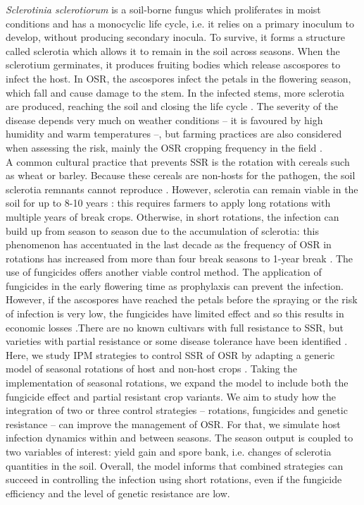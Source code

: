 \documentclass{article}
\begin{document}
\textit{Sclerotinia sclerotiorum} is a soil-borne fungus which proliferates in moist conditions and has a monocyclic life cycle, i.e. it relies on a primary inoculum to develop, without producing secondary inocula. To survive, it forms a structure called sclerotia which allows it to remain in the soil across seasons. When the sclerotium germinates, it produces fruiting bodies which release ascospores to infect the host. In OSR, the ascospores infect the petals in the flowering season, which fall and cause damage to the stem. In the infected stems, more sclerotia are produced, reaching the soil and closing the life cycle \cite{derbyshire:PP:2016, heffer:TPHI:2007}. The severity of the disease depends very much on weather conditions -- it is favoured by high humidity and warm temperatures --, but farming practices are also considered when assessing the risk, mainly the OSR cropping frequency in the field \cite{koch:PhytoP:2007}. 
\\

A common cultural practice that prevents SSR is the rotation with cereals such as wheat or barley. Because these cereals are non-hosts for the pathogen, the soil sclerotia remnants cannot reproduce \cite{}. However, sclerotia can remain viable in the soil for up to 8-10 years \cite{adams:PhytoP:1979}: this requires farmers to apply long rotations with multiple years of break crops. Otherwise, in short rotations, the infection can build up from season to season due to the accumulation of sclerotia: this phenomenon has accentuated in the last decade as the frequency of OSR in rotations has increased from more than four break seasons to 1-year break \cite{OSR:HGCA:2014}. The use of fungicides offers another viable control method.  The application of fungicides in the early flowering time as prophylaxis can prevent the infection. However, if the ascospores have reached the petals before the spraying or the risk of infection is very low, the fungicides have limited effect and so this results in economic losses \cite{}.There are no known cultivars with full resistance to SSR, but varieties with partial resistance or some disease tolerance have been identified \cite{}. 
\\

Here, we study IPM strategies to control SSR of OSR by adapting a  generic model of seasonal rotations of host and non-host crops \cite{bargues-ribera:PCB:2019}. Taking the implementation of seasonal rotations, we expand the model to include both the fungicide effect and partial resistant crop variants. We aim to study how the integration of two or three control strategies -- rotations, fungicides and genetic resistance -- can improve the management of OSR. For that, we simulate host infection dynamics within and between seasons. The season output is coupled to two variables of interest: yield gain and spore bank, i.e. changes of sclerotia quantities in the soil. Overall, the model informs that combined strategies can succeed in controlling the infection using short rotations, even if the fungicide efficiency and the level of genetic resistance are low. 
\end{document}

